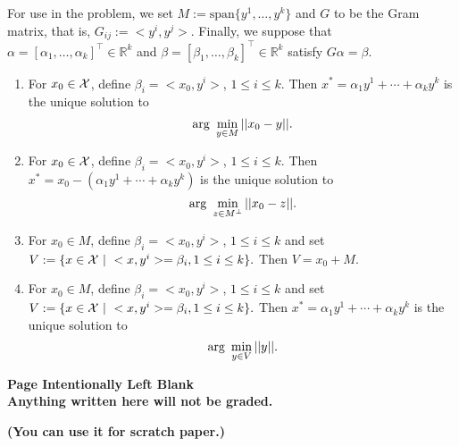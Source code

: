 \documentclass[letterpaper]{article}
\newcommand{\real}{\mathbb R}  %
\newcommand{\spanof}[1]{\textrm{span} \{ #1 \}}
\begin{document}
\begin{enumerate}
    For use in the problem, we set $M := \spanof{y^1, \ldots, y^k}$ and $G$ to be the Gram matrix, that is, $G_{ij} := <y^i, y^j>$. Finally, we suppose that  $\alpha = [\alpha_1, \ldots, \alpha_k]^\top \in \real^k$ and $\beta = [\beta_1, \ldots, \beta_k]^\top \in \real^k$ satisfy
    $G \alpha = \beta.$


\begin{enumerate}
\setlength{\itemsep}{.3cm}
\renewcommand{\labelenumi}{(\alph{enumi})}
\item For $x_0\in {\cal X}$, define $\beta_i=<x_0,y^i>$, $1 \le i \le k$. Then $x^* = \alpha_1 y^1 + \cdots + \alpha_k y^k$ is the unique solution to
$$ {\rm arg}~\min_{y \in M} ||x_0-y||.$$

\item For $x_0\in {\cal X}$, define $\beta_i=<x_0,y^i>$, $1 \le i \le k$. Then $x^* = x_0-\left(\alpha_1 y^1 + \cdots + \alpha_k y^k\right)$ is the unique solution to
$$ {\rm arg}~\min_{z \in M^\perp} ||x_0-z||.$$

 \item  For $x_0\in M$, define $\beta_i=<x_0,y^i>$, $1 \le i \le k$ and  set $V:=\{x\in {\cal X}~|~ <x,y^i> = \beta_i, 1\le i\le k\}.$   Then  $V=x_0+M$.

 \item  For $x_0\in M$, define $\beta_i=<x_0,y^i>$, $1 \le i \le k$ and set $V:=\{x\in {\cal X}~|~ <x,y^i> = \beta_i, 1\le i\le k\}.$  Then $x^* = \alpha_1 y^1 + \cdots + \alpha_k y^k$ is the unique solution to
$$ {\rm arg}~\min_{y \in V} ||y||.$$
\end{enumerate}

\newpage

\begin{center}
\vspace*{6cm}

{\bf \LARGE Page Intentionally Left Blank}\\

\vspace*{3cm}
\textbf{Anything written here will not be graded.}

\textbf{(You can use it for scratch paper.)}

\end{center}



\end{enumerate}
\end{document}
